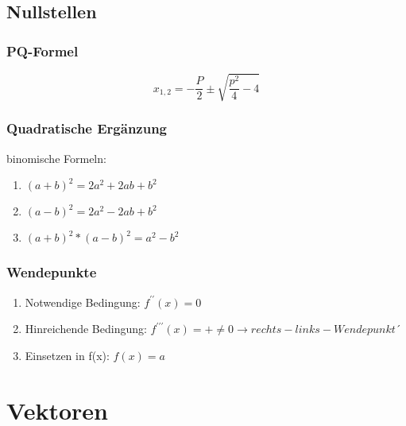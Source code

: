 \documentclass[a4paper,12pt]{article}
\begin{document}
	\subsection*{Nullstellen}
		\subsubsection*{PQ-Formel}
			$$
x_{1, 2} = - \frac{P}{2} \pm \sqrt{\frac{p^{2}}{4}-4}
			$$
		\subsubsection*{Quadratische Ergänzung}
			binomische Formeln:
				\begin{enumerate}
					\item $(a+b)^{2} = 2a^{2}+2ab+b^{2}$
					\item $(a-b)^{2} = 2a^{2}-2ab+b^{2}$
					\item $(a+b)^{2}*(a-b)^{2}  = a^{2}-b^{2}$
				\end{enumerate}
		\subsubsection*{Wendepunkte}
			\begin{enumerate}
				\item Notwendige Bedingung: $f^{\prime\prime}(x)=0$
				\item Hinreichende Bedingung: $f^{\prime\prime\prime}(x)=+\neq0 \rightarrow rechts-links-Wendepunkt´$
				\item Einsetzen in f(x): $f(x)=a$
			\end{enumerate}

\section*{Vektoren}
\end{document}
